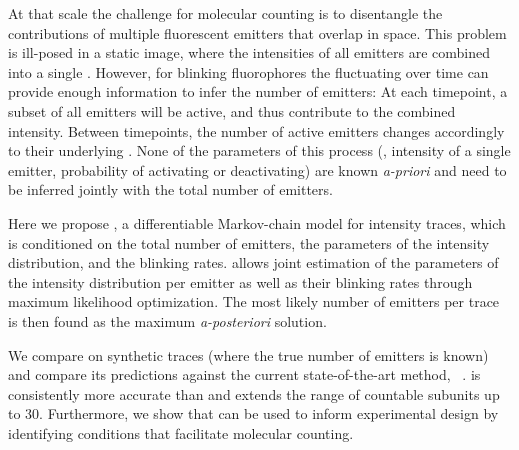 %
At that scale the challenge for molecular counting is to disentangle the contributions
of multiple fluorescent emitters that overlap in space.
%
  This problem is ill-posed in a static image, where the intensities of all
  emitters are combined into a single . However, for blinking fluorophores the
  fluctuating  over time can provide enough
  information to infer the number of emitters:
  At each timepoint, a subset of all emitters will be active, and thus
  contribute to the combined intensity. Between timepoints, the number of
  active emitters changes accordingly to their underlying .
  None of the parameters of this process (\eg, intensity of a single emitter,
  probability of activating or deactivating) are known \emph{a-priori} and need
  to be inferred jointly with the total number of emitters.

Here we propose \ours, a differentiable Markov-chain model for intensity
traces, which is conditioned on the total number of emitters, the parameters of
the intensity distribution, and the blinking rates.
%
  \ours allows joint estimation of the parameters of the intensity distribution
  per emitter as well as their blinking rates through maximum likelihood
  optimization.
  The most likely number of emitters per trace is then found as the maximum
  \emph{a-posteriori} solution.

We compare \ours on synthetic traces (where the true number of emitters is
known) and compare its predictions against the current state-of-the-art method,
\lbfcs~\citep{stein_calibration-free_2021}.
%
  \ours is consistently more accurate than \lbfcs and extends the range of
  countable subunits up to 30.
  Furthermore, we show that \ours can be used to inform experimental design by
  identifying conditions that facilitate molecular counting.

